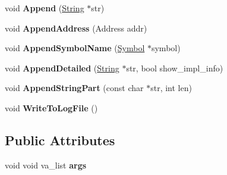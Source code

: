 \begin{DoxyCompactItemize}
\item 
void {\bfseries Append} (\hyperlink{classv8_1_1internal_1_1_string}{String} $\ast$str)\hypertarget{classv8_1_1internal_1_1_log_1_1_b_a_s_e___e_m_b_e_d_d_e_d_abac8ca72f987e2c57fa475a5ce06d1f2}{}\label{classv8_1_1internal_1_1_log_1_1_b_a_s_e___e_m_b_e_d_d_e_d_abac8ca72f987e2c57fa475a5ce06d1f2}

\item 
void {\bfseries Append\+Address} (Address addr)\hypertarget{classv8_1_1internal_1_1_log_1_1_b_a_s_e___e_m_b_e_d_d_e_d_a012f003f168ced14529e1b49b93aef6d}{}\label{classv8_1_1internal_1_1_log_1_1_b_a_s_e___e_m_b_e_d_d_e_d_a012f003f168ced14529e1b49b93aef6d}

\item 
void {\bfseries Append\+Symbol\+Name} (\hyperlink{classv8_1_1internal_1_1_symbol}{Symbol} $\ast$symbol)\hypertarget{classv8_1_1internal_1_1_log_1_1_b_a_s_e___e_m_b_e_d_d_e_d_aef171f48186258ec5e7a268f0b3d2f2d}{}\label{classv8_1_1internal_1_1_log_1_1_b_a_s_e___e_m_b_e_d_d_e_d_aef171f48186258ec5e7a268f0b3d2f2d}

\item 
void {\bfseries Append\+Detailed} (\hyperlink{classv8_1_1internal_1_1_string}{String} $\ast$str, bool show\+\_\+impl\+\_\+info)\hypertarget{classv8_1_1internal_1_1_log_1_1_b_a_s_e___e_m_b_e_d_d_e_d_a38a3fa294739ab23d3655f0f708e43d7}{}\label{classv8_1_1internal_1_1_log_1_1_b_a_s_e___e_m_b_e_d_d_e_d_a38a3fa294739ab23d3655f0f708e43d7}

\item 
void {\bfseries Append\+String\+Part} (const char $\ast$str, int len)\hypertarget{classv8_1_1internal_1_1_log_1_1_b_a_s_e___e_m_b_e_d_d_e_d_ac6780f6731458ef1567e2adc37a91cf4}{}\label{classv8_1_1internal_1_1_log_1_1_b_a_s_e___e_m_b_e_d_d_e_d_ac6780f6731458ef1567e2adc37a91cf4}

\item 
void {\bfseries Write\+To\+Log\+File} ()\hypertarget{classv8_1_1internal_1_1_log_1_1_b_a_s_e___e_m_b_e_d_d_e_d_a7e6f38e7cddc4f4c652fc654283cd7d0}{}\label{classv8_1_1internal_1_1_log_1_1_b_a_s_e___e_m_b_e_d_d_e_d_a7e6f38e7cddc4f4c652fc654283cd7d0}

\end{DoxyCompactItemize}
\subsection*{Public Attributes}
\begin{DoxyCompactItemize}
\item 
void void va\+\_\+list {\bfseries args}\hypertarget{classv8_1_1internal_1_1_log_1_1_b_a_s_e___e_m_b_e_d_d_e_d_a3559977377db572d89c3bf2f7adadbfb}{}\label{classv8_1_1internal_1_1_log_1_1_b_a_s_e___e_m_b_e_d_d_e_d_a3559977377db572d89c3bf2f7adadbfb}

\end{DoxyCompactItemize}
